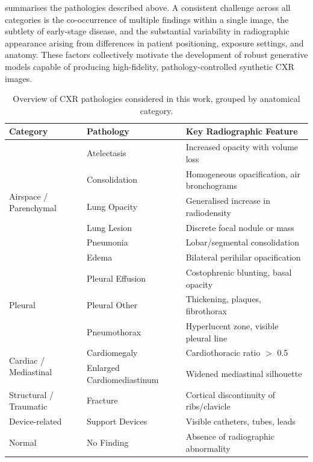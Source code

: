  summarises the pathologies described above. A consistent challenge 
across all categories is the co-occurrence of multiple findings within a single image, the subtlety 
of early-stage disease, and the substantial variability in radiographic appearance arising from 
differences in patient positioning, exposure settings, and anatomy. These factors collectively 
motivate the development of robust generative models capable of producing high-fidelity, 
pathology-controlled synthetic CXR images.

\begin{table}[h!]
\centering
\small
\begin{tabular}{llp{7.5cm}}
\toprule
\textbf{Category} & \textbf{Pathology} & \textbf{Key Radiographic Feature} \\
\midrule
\multirow{6}{*}{Airspace / Parenchymal}
    & Atelectasis            & Increased opacity with volume loss \\
    & Consolidation          & Homogeneous opacification, air bronchograms \\
    & Lung Opacity           & Generalised increase in radiodensity \\
    & Lung Lesion            & Discrete focal nodule or mass \\
    & Pneumonia              & Lobar/segmental consolidation \\
    & Edema                  & Bilateral perihilar opacification \\
\midrule
\multirow{3}{*}{Pleural}
    & Pleural Effusion       & Costophrenic blunting, basal opacity \\
    & Pleural Other          & Thickening, plaques, fibrothorax \\
    & Pneumothorax           & Hyperlucent zone, visible pleural line \\
\midrule
\multirow{2}{*}{Cardiac / Mediastinal}
    & Cardiomegaly           & Cardiothoracic ratio $>$ 0.5 \\
    & Enlarged Cardiomediastinum & Widened mediastinal silhouette \\
\midrule
Structural / Traumatic & Fracture & Cortical discontinuity of ribs/clavicle \\
\midrule
Device-related & Support Devices & Visible catheters, tubes, leads \\
\midrule
Normal & No Finding & Absence of radiographic abnormality \\
\bottomrule
\end{tabular}
\caption{Overview of CXR pathologies considered in this work, grouped by anatomical category.}
\label{tab:pathology_overview}
\end{table}